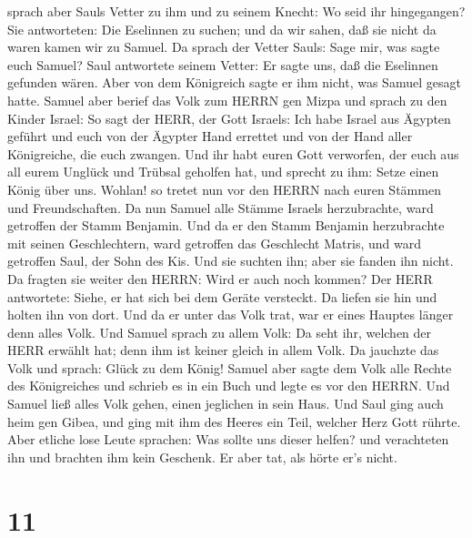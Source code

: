 sprach aber Sauls Vetter zu ihm und zu seinem Knecht: Wo seid ihr
hingegangen? Sie antworteten: Die Eselinnen zu suchen; und da wir sahen,
daß sie nicht da waren kamen wir zu Samuel.  Da sprach der
Vetter Sauls: Sage mir, was sagte euch Samuel?  Saul
antwortete seinem Vetter: Er sagte uns, daß die Eselinnen gefunden
wären. Aber von dem Königreich sagte er ihm nicht, was Samuel gesagt
hatte.  Samuel aber berief das Volk zum HERRN gen Mizpa
 und sprach zu den Kinder Israel: So sagt der HERR, der
Gott Israels: Ich habe Israel aus Ägypten geführt und euch von der
Ägypter Hand errettet und von der Hand aller Königreiche, die euch
zwangen.  Und ihr habt euren Gott verworfen, der euch aus
all eurem Unglück und Trübsal geholfen hat, und sprecht zu ihm: Setze
einen König über uns. Wohlan! so tretet nun vor den HERRN nach euren
Stämmen und Freundschaften.  Da nun Samuel alle Stämme
Israels herzubrachte, ward getroffen der Stamm Benjamin. 
Und da er den Stamm Benjamin herzubrachte mit seinen Geschlechtern, ward
getroffen das Geschlecht Matris, und ward getroffen Saul, der Sohn des
Kis. Und sie suchten ihn; aber sie fanden ihn nicht.  Da
fragten sie weiter den HERRN: Wird er auch noch kommen? Der HERR
antwortete: Siehe, er hat sich bei dem Geräte versteckt. 
Da liefen sie hin und holten ihn von dort. Und da er unter das Volk
trat, war er eines Hauptes länger denn alles Volk.  Und
Samuel sprach zu allem Volk: Da seht ihr, welchen der HERR erwählt hat;
denn ihm ist keiner gleich in allem Volk. Da jauchzte das Volk und
sprach: Glück zu dem König!  Samuel aber sagte dem Volk
alle Rechte des Königreiches und schrieb es in ein Buch und legte es vor
den HERRN. Und Samuel ließ alles Volk gehen, einen jeglichen in sein
Haus.  Und Saul ging auch heim gen Gibea, und ging mit ihm
des Heeres ein Teil, welcher Herz Gott rührte.  Aber
etliche lose Leute sprachen: Was sollte uns dieser helfen? und
verachteten ihn und brachten ihm kein Geschenk. Er aber tat, als hörte
er's nicht.

\hypertarget{section-10}{%
\section{11}\label{section-10}}

